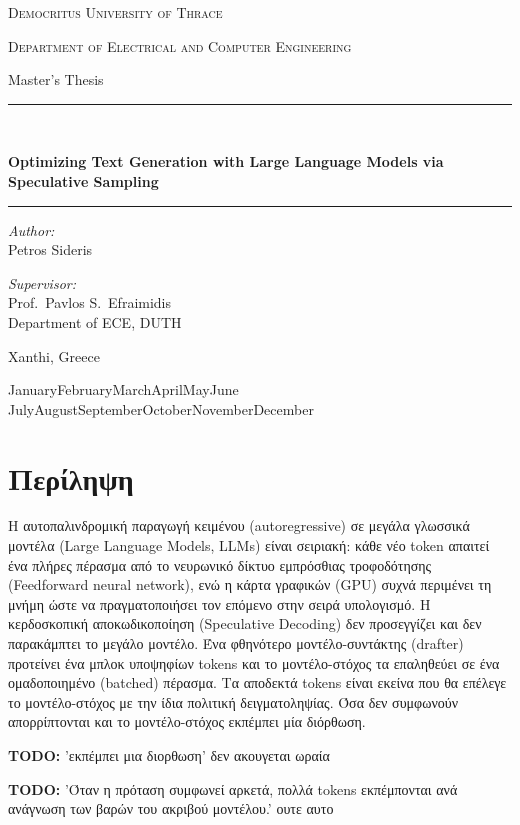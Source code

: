 \documentclass[a4paper,12pt]{report}
\theoremstyle{plain}
\theoremstyle{definition}
\theoremstyle{remark}
\newcommand{\todo}[1]{%
  \par\smallskip
  {\sloppy\noindent\color{red!65!black}\textbf{TODO:} #1\par}%
\smallskip}
\newcommand{\monthyear}{%
  \ifcase\month\or January\or February\or March\or April\or May\or June\or
  July\or August\or September\or October\or November\or December\fi
\space\number\year}
\begin{document}
\begin{titlepage}
  \centering
  {\scshape\LARGE Democritus University of Thrace\par}
  \vspace{0.4cm}
  {\scshape\large Department of Electrical and Computer Engineering\par}
  \vfill
  {\large Master's Thesis\par}
  \vspace{1.0cm}
  \rule{\linewidth}{0.4pt}\\[0.7\baselineskip]
  {\huge\bfseries Optimizing Text Generation with Large Language
  Models via Speculative Sampling\par}
  \vspace{0.7\baselineskip}
  \rule{\linewidth}{0.4pt}\par
  \vspace{2.5cm}
  \begin{minipage}[t]{0.45\textwidth}
    \raggedright
    {\itshape Author:}\\[0.3em]
    Petros Sideris
  \end{minipage}\hfill
  \begin{minipage}[t]{0.45\textwidth}
    \raggedleft
    {\itshape Supervisor:}\\[0.3em]
    Prof.\ Pavlos S.\ Efraimidis\\
    {\footnotesize Department of ECE, DUTH}
  \end{minipage}
  \vfill
  {Xanthi, Greece\par}
  {\monthyear\par}
\end{titlepage}


\chapter*{Περίληψη}

Η αυτοπαλινδρομική παραγωγή κειμένου (autoregressive) σε μεγάλα
γλωσσικά μοντέλα (Large Language Models, LLMs) είναι σειριακή: κάθε
νέο token απαιτεί ένα πλήρες πέρασμα από το νευρωνικό δίκτυο
εμπρόσθιας τροφοδότησης (Feedforward neural network), ενώ η κάρτα
γραφικών (GPU) συχνά περιμένει τη μνήμη ώστε να πραγματοποιήσει τον
επόμενο στην σειρά υπολογισμό. Η κερδοσκοπική αποκωδικοποίηση
(Speculative Decoding) δεν προσεγγίζει και δεν παρακάμπτει το μεγάλο
μοντέλο. Ένα φθηνότερο μοντέλο-συντάκτης (drafter) προτείνει ένα
μπλοκ υποψηφίων tokens και το μοντέλο-στόχος τα επαληθεύει σε ένα
ομαδοποιημένο (batched) πέρασμα. Τα αποδεκτά tokens είναι εκείνα που
θα επέλεγε το μοντέλο-στόχος με την ίδια πολιτική δειγματοληψίας. Όσα
δεν συμφωνούν απορρίπτονται και το μοντέλο-στόχος εκπέμπει μία
διόρθωση. \todo{'εκπέμπει μια διορθωση' δεν ακουγεται ωραία}
\todo{'Όταν η πρόταση συμφωνεί αρκετά, πολλά tokens εκπέμπονται ανά
ανάγνωση των βαρών του ακριβού μοντέλου.' ουτε αυτο}
\end{document}
